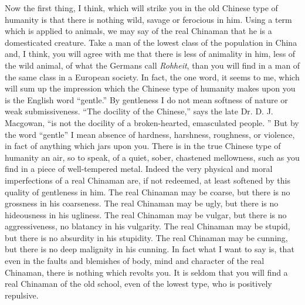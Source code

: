 Now the first thing, I think, which will strike you in the old Chinese type of humanity is that there is nothing wild, savage or ferocious in him. Using a term which is applied to animals, we may say of the real Chinaman that he is a domesticated creature.
Take a man of the lowest class of the population in China and, I think, you will agree with me that there is less of animality in him, less of the wild animal, of what the Germans call \emph{Rohheit}, than you will find in a man of the same class in a European society. In fact, the one word, it seems to me, which will sum up the impression which the Chinese type of humanity makes upon you is the English word ``gentle.''
By gentleness I do not mean softness of nature or weak submissiveness. ``The docility of the Chinese,'' says the late Dr. D. J. Macgowan, ``is not the docility of a broken-hearted, emasculated people. ''
But by the word ``gentle'' I mean absence of hardness, harshness, roughness, or violence, in fact of anything which jars upon you. There is in the true Chinese type of humanity an air, so to speak, of a quiet, sober, chastened mellowness, such as you find in a piece of well-tempered metal. Indeed the very physical and moral imperfections of a real Chinaman are, if not redeemed, at least softened by this quality of gentleness in him.
The real Chinaman may be coarse, but there is no grossness in his coarseness. The real Chinaman may be ugly, but there is no hideousness in his ugliness. The real Chinaman may be vulgar, but there is no aggressiveness, no blatancy in his vulgarity.
The real Chinaman may be stupid, but there is no absurdity in his stupidity.
The real Chinaman may be cunning, but there is no deep malignity in his cunning. In fact what I want to say is, that even in the faults and blemishes of body, mind and character of the real Chinaman,
there is nothing which revolts you. It is seldom that you will find a real Chinaman of the old school, even of the lowest type, who is positively repulsive.

